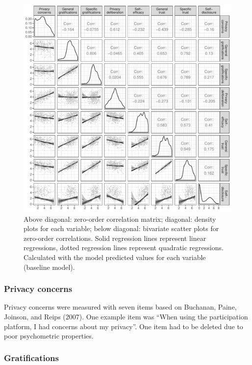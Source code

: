 \documentclass[
  english,
  man,floatsintext]{apa6}
\begin{document}
\begin{figure}[!h]

{\centering \includegraphics[width=.9\textwidth]{manuscript_files/figure-latex/corrplot-1} 

}

\caption{Above diagonal: zero-order correlation matrix; diagonal: density plots for each variable; below diagonal: bivariate scatter plots for zero-order correlations. Solid regression lines represent linear regressions, dotted regression lines represent quadratic regressions. Calculated with the model predicted values for each variable (baseline model).}\label{fig:corrplot}
\end{figure}

\hypertarget{privacy-concerns}{%
\subsubsection{Privacy concerns}\label{privacy-concerns}}

Privacy concerns were measured with seven items based on Buchanan, Paine, Joinson, and Reips (2007).
One example item was \enquote{When using the participation platform, I had concerns about my privacy}.
One item had to be deleted due to poor psychometric properties.

\hypertarget{gratifications}{%
\subsubsection{Gratifications}\label{gratifications}}
\end{document}
